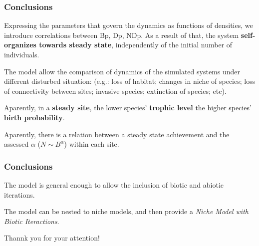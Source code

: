 \documentclass[xcolor=x11names,compress]{beamer}
\renewcommand{\(}{\begin{columns}}
\renewcommand{\)}{\end{columns}}
\newcommand{\<}[1]{\begin{column}{#1}}
\renewcommand{\>}{\end{column}}
\begin{document}
\begin{frame}
\frametitle{Conclusions}

\begin{block}{}
Expressing the parameters that govern the dynamics as functions of densities, we introduce correlations between Bp, Dp, NDp. As a result of that, the system \textbf{self-organizes towards steady state}, independently of the initial number of individuals. 
\end{block}
\pause

\begin{block}{}
The model allow the comparison of dynamics of the simulated systems under different disturbed situation: (e.g.: loss of habitat; changes in niche of species; loss of connectivity between sites; invasive species; extinction of species; etc). 
\end{block}
\pause

\begin{block}{}
Aparently, in a \textbf{steady site}, the lower species' \textbf{trophic level} the higher species' \textbf{birth probability}.
\end{block}
\pause

\begin{block}{}
Aparently, there is a relation between a steady state achievement and the assessed $\alpha$ ($N \sim B^{\alpha}$) within each site. 
\end{block}
\pause

\end{frame}

\begin{frame}

\frametitle{Conclusions}

\begin{block}{}
The model is general enough to allow the inclusion of biotic and abiotic iterations. 
\end{block}
\pause

\begin{block}{}
The model can be nested to niche models, and then provide a \emph{Niche Model with Biotic Iteractions}.
\end{block}
\pause


\end{frame}

\begin{frame}{Thannk you for your attention!}
\end{frame}


\end{document}
